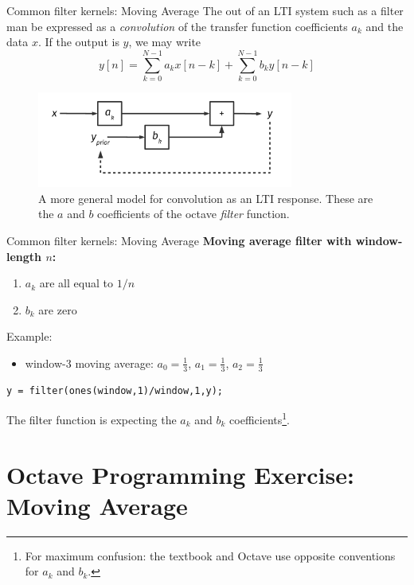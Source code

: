 \documentclass{beamer}
\begin{document}
\begin{frame}{Common filter kernels: Moving Average}
The out of an LTI system such as a filter man be expressed as a \textit{convolution} of the transfer function coefficients $a_k$ and the data $x$. If the output is $y$, we may write
\begin{equation}
y[n] = \sum_{k=0}^{N-1} a_k x[n-k] + \sum_{k=0}^{N-1} b_k y[n-k]
\end{equation}
\begin{figure}
\centering
\includegraphics[width=0.75\textwidth]{figures/kernel2.pdf}
\caption{\label{fig:kernel2} A more general model for convolution as an LTI response.  These are the $a$ and $b$ coefficients of the octave \textit{filter} function.}
\end{figure}
\end{frame}

\begin{frame}[fragile]{Common filter kernels: Moving Average}
\textbf{Moving average filter with window-length $n$:}
\begin{enumerate}
\item $a_k$ are all equal to $1/n$
\item $b_k$ are zero
\end{enumerate}
Example:
\begin{itemize}
\item window-3 moving average: $a_0 = \frac{1}{3}$, $a_1 = \frac{1}{3}$, $a_2 = \frac{1}{3}$
\end{itemize}
\begin{verbatim}
y = filter(ones(window,1)/window,1,y);
\end{verbatim}
The filter function is expecting the $a_k$ and $b_k$ coefficients\footnote{For maximum confusion: the textbook and Octave use opposite conventions for $a_k$ and $b_k$.}.
\end{frame}

\section{Octave Programming Exercise: Moving Average}
\end{document}
